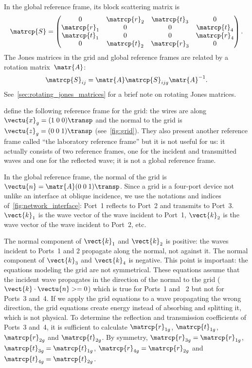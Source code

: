 \begin{refsection}
In the global reference frame, its block scattering matrix is
\begin{equation}
    \matrcp{S}
    =
    \begin{pmatrix}
        0              & \matrcp{r}_{2} & \matrcp{t}_{3} & 0               \\
        \matrcp{r}_{1} & 0              & 0              & \matrcp{t}_{4} \\
        \matrcp{t}_{1} & 0              & 0              & \matrcp{r}_{4} \\
        0              & \matrcp{t}_{2} & \matrcp{r}_{3} & 0
    \end{pmatrix}
    \text{.}
    \label{eq:grid_scattering_global}
\end{equation}
The Jones matrices in the grid and global reference frames are related by a rotation matrix~$\matr{A}$:
\begin{equation}
    \matrcp{S}_{ij} = \matr{A} \matrcp{S}_{ijg} \matr{A}^{-1}
    \text{.}
    \label{eq:grid_rotation}
\end{equation}
See~\cref{sec:rotating_jones_matrices} for a brief note on rotating Jones matrices.

\citeauthor{houde_2001} define the following reference frame for the grid: the wires are along $\vectu{x}_g=(1 \; 0 \; 0)\transp$ and the normal to the grid is $\vectu{z}_g=(0 \; 0 \; 1)\transp$ (see~\cref{fig:grid}).
They also present another reference frame called ``the laboratory reference frame'' but it is not useful for us:
it actually consists of two reference frames, one for the incident and transmitted waves and one for the reflected wave; it is not a global reference frame.

In the global reference frame,
the normal of the grid is $\vectu{n} = \matr{A} (0 \; 0 \; 1)\transp$.
Since a grid is a four-port device not unlike an interface at oblique incidence, we use the notations and indices of~\cref{fig:network_interface}:
Port~1 reflects to Port~2 and transmits to Port~3.
$\vect{k}_1$ is the wave vector of the wave incident to Port~1,
$\vect{k}_2$ is the wave vector of the wave incident to Port~2, etc.

The normal component of $\vect{k}_1$ and $\vect{k}_2$ is positive: the waves incident to Ports~1 and 2 propagate along the normal, not against it.
The normal component of $\vect{k}_3$ and $\vect{k}_4$ is negative.
This point is important: the equations modeling the grid are not symmetrical.
These equations assume that the incident wave propagates in the direction of the normal to the grid ($\vect{k} \cdot \vectu{n} >= 0$)
which is true for Ports~1 and ~2 but not for Ports~3 and~4.
If we apply the grid equations to a wave propagating the wrong direction, the grid equations create energy instead of absorbing and splitting it, which is not physical.
To determine the reflection and transmission coefficients of Ports~3 and~4,
it is sufficient to calculate
$\matrcp{r}_{1g}$, $\matrcp{t}_{1g}$, $\matrcp{r}_{2g}$ and $\matrcp{t}_{2g}$.
By symmetry,
$\matrcp{r}_{3g}=\matrcp{r}_{1g}$,
$\matrcp{t}_{3g}=\matrcp{t}_{1g}$,
$\matrcp{r}_{4g}=\matrcp{r}_{2g}$ and
$\matrcp{t}_{4g}=\matrcp{t}_{2g}$.


\end{refsection}
